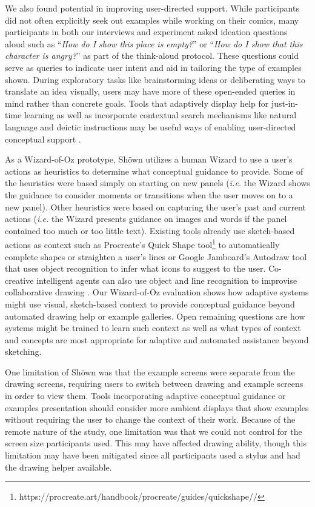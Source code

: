 We also found potential in improving user-directed support. While participants did not often explicitly seek out examples while working on their comics, many participants in both our interviews and experiment asked ideation questions aloud such as ``\textit{How do I show this place is empty?}'' or ``\textit{How do I show that this character is angry?}'' as part of the think-aloud protocol. These questions could serve as queries to indicate user intent and aid in tailoring the type of examples shown. During exploratory tasks like brainstorming ideas or deliberating ways to translate an idea visually, users may have more of these open-ended queries in mind rather than concrete goals. Tools that adaptively display help for just-in-time learning as well as incorporate contextual search mechanisms like natural language and deictic instructions may be useful ways of enabling user-directed conceptual support \cite{fraser2020remap, Graesser2001, laput2013pixeltone, Yoon}. 

As a Wizard-of-Oz prototype, Sh{\"o}wn utilizes a human Wizard to use a user's actions as heuristics to determine what conceptual guidance to provide. Some of the heuristics were based simply on starting on new panels (\textit{i.e.} the Wizard shows the guidance to consider moments or transitions when the user moves on to a new panel). Other heuristics were based on capturing the user's past and current actions (\textit{i.e.} the Wizard presents guidance on images and words if the panel contained too much or too little text). Existing tools already use sketch-based actions as context such as Procreate's Quick Shape tool\footnote{https://procreate.art/handbook/procreate/guides/quickshape//} to automatically complete shapes or straighten a user's lines or Google Jamboard's Autodraw tool that uses object recognition to infer what icons to suggest to the user. Co-creative intelligent agents can also use object and line recognition to improvise collaborative drawing \cite{Davis2016}. Our Wizard-of-Oz evaluation shows how adaptive systems might use visual, sketch-based context to provide conceptual guidance beyond automated drawing help or example galleries. Open remaining questions are how systems might be trained to learn such context as well as what types of context and concepts are most appropriate for adaptive and automated assistance beyond sketching.

One limitation of Sh{\"o}wn was that the example screens were separate from the drawing screens, requiring users to switch between drawing and example screens in order to view them. Tools incorporating adaptive conceptual guidance or examples presentation should consider more ambient displays that show examples without requiring the user to change the context of their work. Because of the remote nature of the study, one limitation was that we could not control for the screen size participants used. This may have affected drawing ability, though this limitation may have been mitigated since all participants used a stylus and had the drawing helper available.

